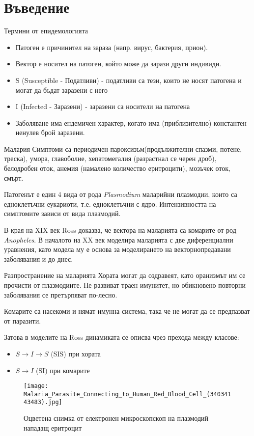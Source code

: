 \section{\hspace{1em}Въведение}

\begin{frame}[t]{Термини от епидемологията}
  \begin{itemize}
    \item Патоген е причинител на зараза (напр. вирус, бактерия, прион).
    \item Вектор е носител на патоген, който може да зарази други индивиди.
    \item S (Susceptible - Податливи) - податливи са тези, които не носят патогена и могат да бъдат заразени с него
    \item I (Infected - Заразени) - заразени са носители на патогена
    \item Заболяване има ендемичен характер, когато има (приблизително) константен ненулев брой заразени.
  \end{itemize}
\end{frame}

\begin{frame}[t]{Малария}
  Симптоми са периодичен пароксизъм(продължителни спазми, потене, треска), умора, главоболие, хепатомегалия (разрастнал се черен дроб), белодробен оток, анемия (намалено количество еритроцити), мозъчек оток, смърт.

  Патогенът е един 4 вида от рода \textit{Plasmodium} маларийни плазмодии, които са едноклетъчни еукариоти, т.е. едноклетъчни с ядро. Интензивността на симптомите зависи от вида плазмодий.

  В края на XIX век Ross доказва, че вектора на маларията са комарите от род \textit{Anopheles}.
  В началото на XX век моделира маларията с две диференциални уравнения, като модела му е основа за моделирането на векторнопредавани заболявания и до днес.
\end{frame}

\begin{frame}[t]{Разпространение на маларията}
  Хората могат да оздравеят, като оранизмът им се прочисти от плазмодиите.
  Не развиват траен имунитет, но обикновено повторни заболявания се претърпяват по-лесно.

  Комарите са насекоми и нямат имунна система, така че не могат да се предпазват от паразити.

  Затова в моделите на Ross динамиката се описва чрез прехода между класове:
  \begin{itemize}
    \item $S \rightarrow I \rightarrow S$ (SIS) при хората
    \item $S \rightarrow I$ (SI) при комарите
  \end{itemize}

  \begin{figure}
    \texttt{[image: Malaria\_Parasite\_Connecting\_to\_Human\_Red\_Blood\_Cell\_(34034143483).jpg]}
    \centering
    \caption{Оцветена снимка от електронен микроскопскоп на плазмодий нападащ еритроцит}
  \end{figure}
\end{frame}
